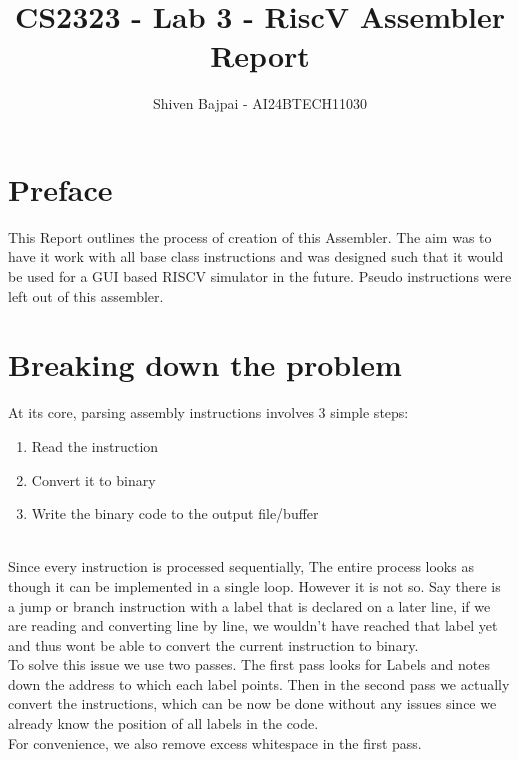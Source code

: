 \documentclass[12pt]{article}
\begin{document}
	
	\vspace{3cm}

	\title{CS2323 - Lab 3 - RiscV Assembler Report}
	\author{Shiven Bajpai - AI24BTECH11030}

	\maketitle
	\bigskip

	\renewcommand{\thefigure}{\theenumi}
	\renewcommand{\thetable}{\theenumi}

	\tableofcontents

	\newpage

	\section{Preface}
	This Report outlines the process of creation of this Assembler. The aim was to have it work with all base class instructions and was designed such that it would be used for a GUI based RISCV simulator in the future. 
	Pseudo instructions were left out of this assembler.

	\section{Breaking down the problem}
	At its core, parsing assembly instructions involves 3 simple steps:\\

	\begin{enumerate}
		\item{Read the instruction}
		\item{Convert it to binary}
		\item{Write the binary code to the output file/buffer\\\\}
	\end{enumerate}

	Since every instruction is processed sequentially, The entire process looks as though it can be implemented in a single loop. However it is not so. Say there is a jump or branch instruction with a label that is declared on a later line, if we are reading and converting line by line, we wouldn't have reached that label yet and thus wont be able to convert the current instruction to binary.\\
	To solve this issue we use two passes. The first pass looks for Labels and notes down the address to which each label points. Then in the second pass we actually convert the instructions, which can be now be done without any issues since we already know the position of all labels in the code.\\
	For convenience, we also remove excess whitespace in the first pass.\\\\
\end{document}
